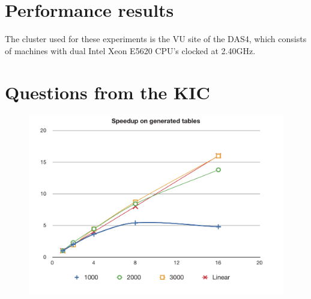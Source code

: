 \documentclass[11pt,a4paper]{article}
\begin{document}
\section{Performance results}
The cluster used for these experiments is the VU site of the DAS4, which consists of machines with dual Intel Xeon E5620 CPU's clocked at 2.40GHz.

\section{Questions from the KIC}

\begin{figure}[t]
\includegraphics[scale=0.8]{figures/speedup.pdf}
\end{figure}
\end{document}
